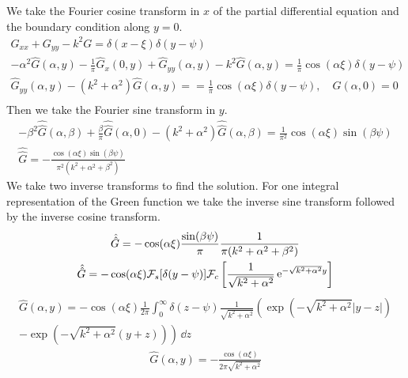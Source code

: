 {%
\begin{Solution}
  We take the Fourier cosine transform in $x$ of the partial differential 
  equation and the boundary condition along $y = 0$.
  \begin{gather*}
    G_{x x} + G_{y y} - k^2 G = \delta(x-\xi) \delta(y - \psi) \\
    - \alpha^2 \hat{G}(\alpha,y) - \frac{1}{\pi} \hat{G}_x(0,y)
    + \hat{G}_{y y}(\alpha,y) - k^2 \hat{G}(\alpha,y)
    = \frac{1}{\pi} \cos(\alpha \xi) \delta(y-\psi) \\
    \hat{G}_{y y}(\alpha,y) - (k^2 + \alpha^2) \hat{G}(\alpha,y) = 
    = \frac{1}{\pi} \cos(\alpha \xi) \delta(y-\psi), \quad
    \hat{G}(\alpha,0) = 0 \\
  \end{gather*}
  Then we take the Fourier sine transform in $y$.
  \begin{gather*}
    -\beta^2 \hat{\hat{G}}(\alpha,\beta) 
    + \frac{\beta}{\pi} \hat{\hat{G}}(\alpha,0) 
    - (k^2 + \alpha^2) \hat{\hat{G}}(\alpha,\beta) 
    = \frac{1}{\pi^2} \cos(\alpha\xi) \sin(\beta\psi) \\
    \hat{\hat{G}} = - \frac{ \cos(\alpha\xi) \sin(\beta\psi) }
    { \pi^2 (k^2 + \alpha^2 + \beta^2) }
  \end{gather*}
  We take two inverse transforms to find the solution.  For one integral 
  representation of the Green function we take the inverse sine transform
  followed by the inverse cosine transform.
  \begin{gather*}
    \hat{\hat{G}} = - \cos(\alpha\xi) \frac{\sin(\beta\psi)}{\pi}
    \frac{1}{\pi(k^2 + \alpha^2 + \beta^2)} 
    \\
    \hat{\hat{G}} = - \cos(\alpha\xi) \mathcal{F}_s [\delta(y-\psi)]
    \mathcal{F}_c \left[ \frac{1}{ \sqrt{k^2+\alpha^2} }
      \mathop{\mathrm{e}}\nolimits^{ - \sqrt{ k^2 + \alpha^2 } y } \right] 
  \end{gather*}
  \begin{multline*}
    \hat{G}(\alpha,y) = - \cos(\alpha \xi) \frac{1}{2\pi} \int_0^\infty
    \delta(z-\psi) \frac{1}{\sqrt{k^2+\alpha^2}} \left(
      \exp\left( - \sqrt{k^2 + \alpha^2} |y-z| \right) \right.
    \\
    - \left. \exp\left( - \sqrt{k^2 + \alpha^2} (y+z) \right) \right) \,\dd z 
  \end{multline*}
  \begin{gather*}
    \hat{G}(\alpha,y) = - \frac{ \cos(\alpha \xi) }{ 2 \pi \sqrt{k^2 + \alpha^2} }

\end{gather*}
\end{Solution}}
